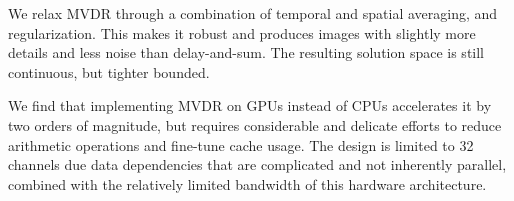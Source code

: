 We relax MVDR through a combination of temporal and spatial averaging, and regularization. This makes it robust and produces images with slightly more details and less noise than delay-and-sum. The resulting solution space is still continuous, but tighter bounded.

We find that implementing MVDR on GPUs instead of CPUs accelerates it by two orders of magnitude, but requires considerable and delicate efforts to reduce arithmetic operations and fine-tune cache usage. The design is limited to 32 channels due data dependencies that are complicated and not inherently parallel, combined with the relatively limited bandwidth of this hardware architecture. 



%

%




%

